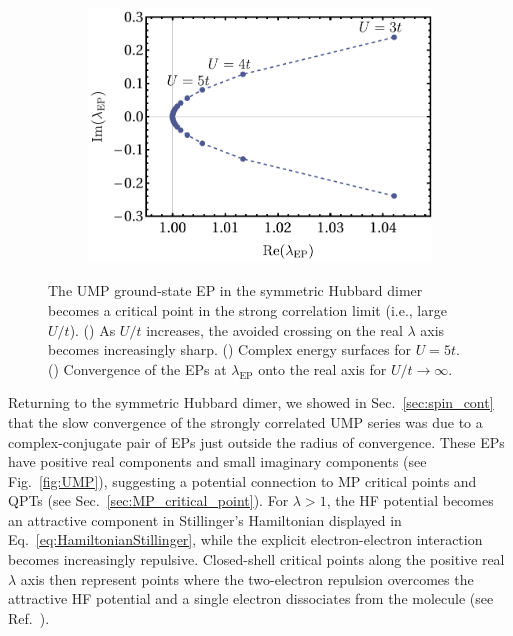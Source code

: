 \documentclass[aps,prb,reprint,noshowkeys,superscriptaddress]{revtex4-1}
\newcommand{\latin}[1]{#1}
\newcommand{\ie}{\latin{i.e.}}
\newcommand{\lep}{\lambda_{\text{EP}}}
\begin{document}
\begin{figure}[t]
\begin{subfigure}{0.32\textwidth}
	\includegraphics[height=0.75\textwidth]{fig8c}	
		\subcaption{\label{subfig:ump_ep_to_cp}}
    \end{subfigure}
\caption{%
    The UMP ground-state EP in the symmetric Hubbard dimer becomes a critical point in the strong correlation limit (\ie, large $U/t$).
    () As $U/t$ increases, the avoided crossing on the real $\lambda$ axis
    becomes increasingly sharp.
    () Complex energy surfaces for $U = 5t$.
    () Convergence of the EPs at $\lep$ onto the real axis for $U/t \to \infty$.
\label{fig:UMP_cp}}

\end{figure}

Returning to the symmetric Hubbard dimer, we showed in Sec.~\ref{sec:spin_cont} that the slow
convergence of the strongly correlated UMP series
was due to a complex-conjugate pair of EPs just outside the radius of convergence.
These EPs have positive real components and small imaginary components (see Fig.~\ref{fig:UMP}), suggesting a potential 
connection to MP critical points and QPTs (see Sec.~\ref{sec:MP_critical_point}).
For $\lambda>1$, the HF potential becomes an attractive component in Stillinger's 
Hamiltonian displayed in Eq.~\eqref{eq:HamiltonianStillinger}, while the explicit electron-electron interaction
becomes increasingly repulsive.
Closed-shell critical points along the positive real $\lambda$ axis then represent 
points where the two-electron repulsion overcomes the attractive HF potential 
and a single electron dissociates from the molecule (see Ref.~).
\end{document}
